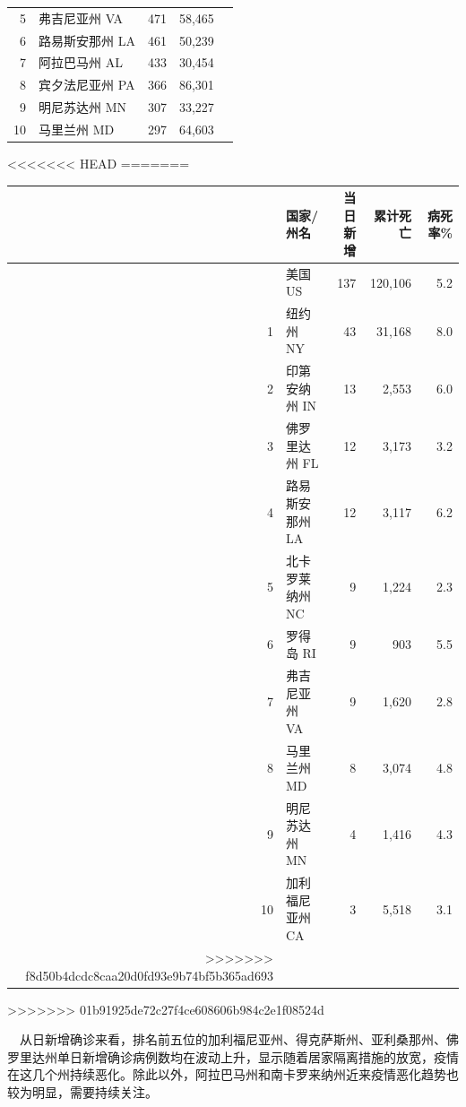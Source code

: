 \documentclass[
]{article}
\begin{document}
\begin{table}[H]
\begin{minipage}{.7\linewidth}
\begin{table}[H]
\begin{tabular}{rlrrr}
5 & 弗吉尼亚州 VA & 471 & 58,465\\
\rowcolor{gray!6}  6 & 路易斯安那州 LA & 461 & 50,239\\
7 & 阿拉巴马州 AL & 433 & 30,454\\
\rowcolor{gray!6}  8 & 宾夕法尼亚州 PA & 366 & 86,301\\
9 & 明尼苏达州 MN & 307 & 33,227\\
\rowcolor{gray!6}  10 & 马里兰州 MD & 297 & 64,603\\
\bottomrule
\end{tabular}
<<<<<<< HEAD
=======
\end{table} \end{minipage}%
    \begin{minipage}{.7\linewidth}
     \caption{美国新增死亡前十位州}
     \vspace{0.5\baselineskip}
      \centering
    \captionsetup{justification=centering} \begin{table}[H]
\centering
\begin{tabular}{rlrrr}
\toprule
  & 国家/州名 & 当日新增 & 累计死亡 & 病死率\%\\
\midrule
\rowcolor{gray!6}   & 美国 US & 137 & 120,106 & 5.2\\
1 & 纽约州 NY & 43 & 31,168 & 8.0\\
\rowcolor{gray!6}  2 & 印第安纳州 IN & 13 & 2,553 & 6.0\\
3 & 佛罗里达州 FL & 12 & 3,173 & 3.2\\
\rowcolor{gray!6}  4 & 路易斯安那州 LA & 12 & 3,117 & 6.2\\
5 & 北卡罗莱纳州 NC & 9 & 1,224 & 2.3\\
\rowcolor{gray!6}  6 & 罗得岛 RI & 9 & 903 & 5.5\\
7 & 弗吉尼亚州 VA & 9 & 1,620 & 2.8\\
\rowcolor{gray!6}  8 & 马里兰州 MD & 8 & 3,074 & 4.8\\
9 & 明尼苏达州 MN & 4 & 1,416 & 4.3\\
\rowcolor{gray!6}  10 & 加利福尼亚州 CA & 3 & 5,518 & 3.1\\
>>>>>>> f8d50b4dcdc8caa20d0fd93e9b74bf5b365ad693
\bottomrule
\end{tabular}
>>>>>>> 01b91925de72c27f4ce608606b984c2e1f08524d
\end{table} \end{minipage} 
\end{table}

\(\quad\)从日新增确诊来看，排名前五位的加利福尼亚州、得克萨斯州、亚利桑那州、佛罗里达州单日新增确诊病例数均在波动上升，显示随着居家隔离措施的放宽，疫情在这几个州持续恶化。除此以外，阿拉巴马州和南卡罗来纳州近来疫情恶化趋势也较为明显，需要持续关注。
\end{document}
